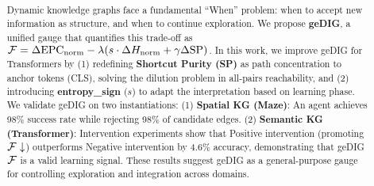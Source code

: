
\title{
}


\author{%
}


\begin{abstract}
Dynamic knowledge graphs face a fundamental ``When'' problem: when to accept new information as structure, and when to continue exploration. We propose \textbf{geDIG}, a unified gauge that quantifies this trade-off as $\mathcal{F} = \Delta\mathrm{EPC}_{\mathrm{norm}} - \lambda(s \cdot \Delta H_{\mathrm{norm}} + \gamma \Delta \mathrm{SP})$. In this work, we improve geDIG for Transformers by (1) redefining \textbf{Shortcut Purity (SP)} as path concentration to anchor tokens (CLS), solving the dilution problem in all-pairs reachability, and (2) introducing \textbf{entropy\_sign} ($s$) to adapt the interpretation based on learning phase. We validate geDIG on two instantiations: (1) \textbf{Spatial KG (Maze)}: An agent achieves 98\% success rate while rejecting 98\% of candidate edges. (2) \textbf{Semantic KG (Transformer)}: Intervention experiments show that Positive intervention (promoting $\mathcal{F} \downarrow$) outperforms Negative intervention by 4.6\% accuracy, demonstrating that geDIG $\mathcal{F}$ is a valid learning signal. These results suggest geDIG as a general-purpose gauge for controlling exploration and integration across domains.
\end{abstract}


\begingroup
\setlength{\tabcolsep}{0pt}
\maketitle
\endgroup

